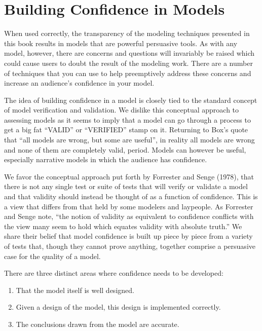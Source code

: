 \documentclass[]{memoir}
\begin{document}
\chapter{Building Confidence in Models}

When used correctly, the transparency of the modeling techniques
presented in this book results in models that are powerful persuasive
tools. As with any model, however, there are concerns and questions will
invariably be raised which could cause users to doubt the result of the
modeling work. There are a number of techniques that you can use to help
preemptively address these concerns and increase an audience's
confidence in your model.

The idea of building confidence in a model is closely tied to the
standard concept of model verification and validation. We dislike this
conceptual approach to assessing models as it seems to imply that a
model can go through a process to get a big fat ``VALID'' or
``VERIFIED'' stamp on it. Returning to Box's quote that ``all models are
wrong, but some are useful'', in reality all models are wrong and none
of them are completely valid, period. Models can however be useful,
especially narrative models in which the audience has confidence.

We favor the conceptual approach put forth by Forrester and Senge
(1978), that there is not any single test or suite of tests that will
verify or validate a model and that validity should instead be thought
of as a function of confidence. This is a view that differs from that
held by some modelers and laypeople. As Forrester and Senge note, ``the
notion of validity as equivalent to confidence conflicts with the view
many seem to hold which equates validity with absolute truth.'' We share
their belief that model confidence is built up piece by piece from a
variety of tests that, though they cannot prove anything, together
comprise a persuasive case for the quality of a model.

There are three distinct areas where confidence needs to be developed:

\begin{enumerate}
\def\labelenumi{\arabic{enumi}.}
\itemsep1pt\parskip0pt
\item
  That the model itself is well designed.
\item
  Given a design of the model, this design is implemented correctly.
\item
  The conclusions drawn from the model are accurate.
\end{enumerate}
\end{document}
